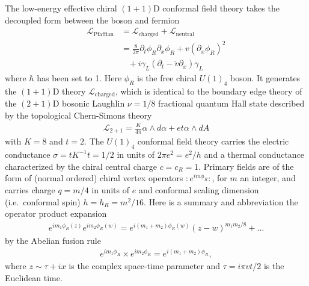 The low-energy effective chiral $(1+1)$D conformal field theory takes the decoupled form between the boson and fermion \begin{align}\mathcal{L}_{\mathrm{Pfaffian}}&=\mathcal{L}_{\mathrm{charged}}+\mathcal{L}_{\mathrm{neutral}}\label{Pfaffian}\\&=\frac{8}{2\pi}\partial_t\phi_R\partial_x\phi_R+v(\partial_x\phi_R)^2\nonumber\\&\;\;\;+i\gamma_L(\partial_t-\tilde{v}\partial_x)\gamma_L\nonumber\end{align} where $\hbar$ has been set to 1. Here $\phi_R$ is the free chiral $U(1)_4$ boson. It generates the $(1+1)$D theory $\mathcal{L}_{\mathrm{charged}}$, which is identical to the boundary edge theory of the $(2+1)$D bosonic Laughlin $\nu=1/8$ fractional quantum Hall state described by the topological Chern-Simons theory~\cite{WenZee92,Wenedgereview} \begin{align}\mathcal{L}_{2+1}=\frac{K}{4\pi}\alpha\wedge d\alpha+et\alpha\wedge dA\label{LFQHCS}\end{align} with $K=8$ and $t=2$. The $U(1)_4$ conformal field theory carries the electric conductance $\sigma=tK^{-1}t=1/2$ in units of $2\pi e^2=e^2/h$ and a thermal conductance characterized by the chiral central charge $c=c_R=1$. Primary fields are of the form of (normal ordered) chiral vertex operators $:e^{im\phi_R}:$, for $m$ an integer, and carries charge $q=m/4$ in units of $e$ and conformal scaling dimension (i.e.~conformal spin) $h=h_R=m^2/16$. Here is a summary and abbreviation the operator product expansion \begin{align}e^{im_1\phi_R(z)}e^{im_2\phi_R(w)}=e^{i(m_1+m_2)\phi_R(w)}(z-w)^{m_1m_2/8}+\ldots\end{align} by the Abelian fusion rule \begin{align}e^{im_1\phi_R}\times e^{im_2\phi_R}=e^{i(m_1+m_2)\phi_R},\end{align} where $z\sim\tau+ix$ is the complex space-time parameter and $\tau=i\pi vt/2$ is the Euclidean time.

